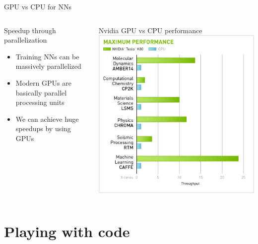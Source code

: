 \documentclass[aspectratio=169]{beamer}
\begin{document}
	\begin{frame}{GPU vs CPU for NNs}
		\begin{columns}[T]
		    \begin{column}{.5\textwidth}
		    	\begin{block}{Speedup through parallelization}
		    		\begin{itemize}
		    			\item Training NNs can be massively parallelized
		    			\item Modern GPUs are basically parallel processing units
		    			\item We can achieve huge speedups by using GPUs
		    		\end{itemize}
		   		\end{block}
		    \end{column}
		    \begin{column}{.5\textwidth}
		    	\begin{block}{Nvidia GPU vs CPU performance}
		    		\includegraphics[width=.95\textwidth,height=0.7\textheight]{images/k80.jpg}
		    	\end{block}
		    \end{column}
		  \end{columns}
	\end{frame}

\section{Playing with code}
\end{document}
